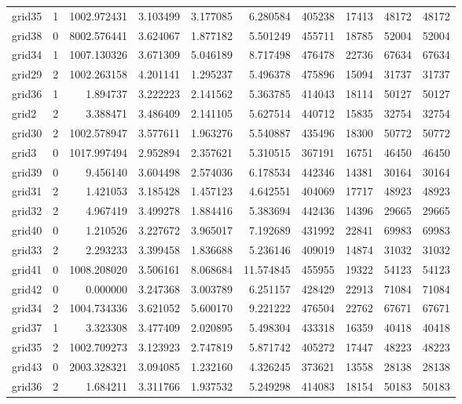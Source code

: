 \documentclass[../../../thesis.tex]{subfiles}
\begin{document}
\begin{longtable}{|l|r|r|r|r|r|r|r|r|r|}
grid35 & 1 & 1002.972431 & 3.103499 & 3.177085 & 6.280584 & 405238 & 17413 & 48172 & 48172 \\
grid38 & 0 & 8002.576441 & 3.624067 & 1.877182 & 5.501249 & 455711 & 18785 & 52004 & 52004 \\
grid34 & 1 & 1007.130326 & 3.671309 & 5.046189 & 8.717498 & 476478 & 22736 & 67634 & 67634 \\
grid29 & 2 & 1002.263158 & 4.201141 & 1.295237 & 5.496378 & 475896 & 15094 & 31737 & 31737 \\
grid36 & 1 & 1.894737 & 3.222223 & 2.141562 & 5.363785 & 414043 & 18114 & 50127 & 50127 \\
grid2 & 2 & 3.388471 & 3.486409 & 2.141105 & 5.627514 & 440712 & 15835 & 32754 & 32754 \\
grid30 & 2 & 1002.578947 & 3.577611 & 1.963276 & 5.540887 & 435496 & 18300 & 50772 & 50772 \\
grid3 & 0 & 1017.997494 & 2.952894 & 2.357621 & 5.310515 & 367191 & 16751 & 46450 & 46450 \\
grid39 & 0 & 9.456140 & 3.604498 & 2.574036 & 6.178534 & 442346 & 14381 & 30164 & 30164 \\
grid31 & 2 & 1.421053 & 3.185428 & 1.457123 & 4.642551 & 404069 & 17717 & 48923 & 48923 \\
grid32 & 2 & 4.967419 & 3.499278 & 1.884416 & 5.383694 & 442436 & 14396 & 29665 & 29665 \\
grid40 & 0 & 1.210526 & 3.227672 & 3.965017 & 7.192689 & 431992 & 22841 & 69983 & 69983 \\
grid33 & 2 & 2.293233 & 3.399458 & 1.836688 & 5.236146 & 409019 & 14874 & 31032 & 31032 \\
grid41 & 0 & 1008.208020 & 3.506161 & 8.068684 & 11.574845 & 455955 & 19322 & 54123 & 54123 \\
grid42 & 0 & 0.000000 & 3.247368 & 3.003789 & 6.251157 & 428429 & 22913 & 71084 & 71084 \\
grid34 & 2 & 1004.734336 & 3.621052 & 5.600170 & 9.221222 & 476504 & 22762 & 67671 & 67671 \\
grid37 & 1 & 3.323308 & 3.477409 & 2.020895 & 5.498304 & 433318 & 16359 & 40418 & 40418 \\
grid35 & 2 & 1002.709273 & 3.123923 & 2.747819 & 5.871742 & 405272 & 17447 & 48223 & 48223 \\
grid43 & 0 & 2003.328321 & 3.094085 & 1.232160 & 4.326245 & 373621 & 13558 & 28138 & 28138 \\
grid36 & 2 & 1.684211 & 3.311766 & 1.937532 & 5.249298 & 414083 & 18154 & 50183 & 50183 \\

\end{longtable}
\end{document}
